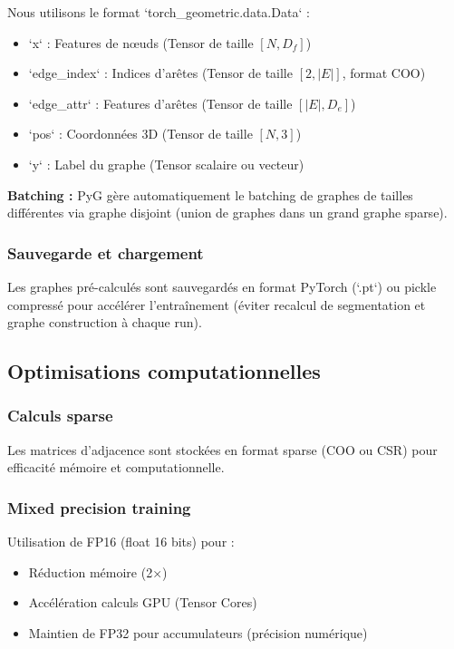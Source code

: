 Nous utilisons le format `torch_geometric.data.Data` :
\begin{itemize}
    \item `x` : Features de nœuds (Tensor de taille $[N, D_f]$)
    \item `edge_index` : Indices d'arêtes (Tensor de taille $[2, |E|]$, format COO)
    \item `edge_attr` : Features d'arêtes (Tensor de taille $[|E|, D_e]$)
    \item `pos` : Coordonnées 3D (Tensor de taille $[N, 3]$)
    \item `y` : Label du graphe (Tensor scalaire ou vecteur)
\end{itemize}

\textbf{Batching :}
PyG gère automatiquement le batching de graphes de tailles différentes via graphe disjoint (union de graphes dans un grand graphe sparse).

\subsubsection{Sauvegarde et chargement}

Les graphes pré-calculés sont sauvegardés en format PyTorch (`.pt`) ou pickle compressé pour accélérer l'entraînement (éviter recalcul de segmentation et graphe construction à chaque run).

\subsection{Optimisations computationnelles}

\subsubsection{Calculs sparse}

Les matrices d'adjacence sont stockées en format sparse (COO ou CSR) pour efficacité mémoire et computationnelle.

\subsubsection{Mixed precision training}

Utilisation de FP16 (float 16 bits) pour :
\begin{itemize}
    \item Réduction mémoire (2×)
    \item Accélération calculs GPU (Tensor Cores)
    \item Maintien de FP32 pour accumulateurs (précision numérique)
\end{itemize}


